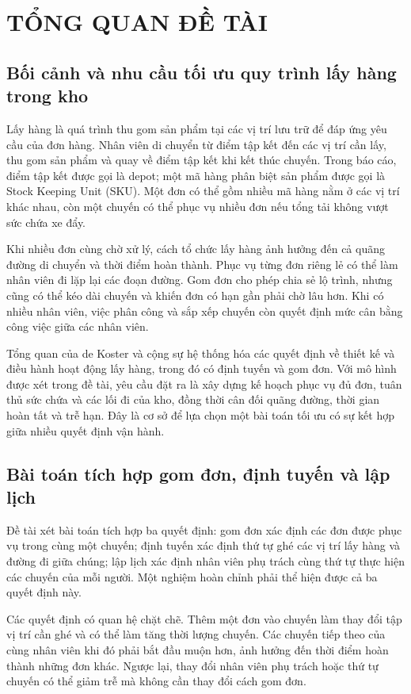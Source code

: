 \section{TỔNG QUAN ĐỀ TÀI}
\label{sec:chuong1}

\subsection{Bối cảnh và nhu cầu tối ưu quy trình lấy hàng trong kho}
Lấy hàng là quá trình thu gom sản phẩm tại các vị trí lưu trữ để đáp ứng yêu cầu của đơn hàng. Nhân viên di chuyển từ điểm tập kết đến các vị trí cần lấy, thu gom sản phẩm và quay về điểm tập kết khi kết thúc chuyến. Trong báo cáo, điểm tập kết được gọi là depot; một mã hàng phân biệt sản phẩm được gọi là Stock Keeping Unit (SKU). Một đơn có thể gồm nhiều mã hàng nằm ở các vị trí khác nhau, còn một chuyến có thể phục vụ nhiều đơn nếu tổng tải không vượt sức chứa xe đẩy.

Khi nhiều đơn cùng chờ xử lý, cách tổ chức lấy hàng ảnh hưởng đến cả quãng đường di chuyển và thời điểm hoàn thành. Phục vụ từng đơn riêng lẻ có thể làm nhân viên đi lặp lại các đoạn đường. Gom đơn cho phép chia sẻ lộ trình, nhưng cũng có thể kéo dài chuyến và khiến đơn có hạn gần phải chờ lâu hơn. Khi có nhiều nhân viên, việc phân công và sắp xếp chuyến còn quyết định mức cân bằng công việc giữa các nhân viên.

Tổng quan của de Koster và cộng sự \cite{dekoster2007} hệ thống hóa các quyết định về thiết kế và điều hành hoạt động lấy hàng, trong đó có định tuyến và gom đơn. Với mô hình được xét trong đề tài, yêu cầu đặt ra là xây dựng kế hoạch phục vụ đủ đơn, tuân thủ sức chứa và các lối đi của kho, đồng thời cân đối quãng đường, thời gian hoàn tất và trễ hạn. Đây là cơ sở để lựa chọn một bài toán tối ưu có sự kết hợp giữa nhiều quyết định vận hành.

\subsection{Bài toán tích hợp gom đơn, định tuyến và lập lịch}
Đề tài xét bài toán tích hợp ba quyết định: gom đơn xác định các đơn được phục vụ trong cùng một chuyến; định tuyến xác định thứ tự ghé các vị trí lấy hàng và đường đi giữa chúng; lập lịch xác định nhân viên phụ trách cùng thứ tự thực hiện các chuyến của mỗi người. Một nghiệm hoàn chỉnh phải thể hiện được cả ba quyết định này.

Các quyết định có quan hệ chặt chẽ. Thêm một đơn vào chuyến làm thay đổi tập vị trí cần ghé và có thể làm tăng thời lượng chuyến. Các chuyến tiếp theo của cùng nhân viên khi đó phải bắt đầu muộn hơn, ảnh hưởng đến thời điểm hoàn thành những đơn khác. Ngược lại, thay đổi nhân viên phụ trách hoặc thứ tự chuyến có thể giảm trễ mà không cần thay đổi cách gom đơn.

